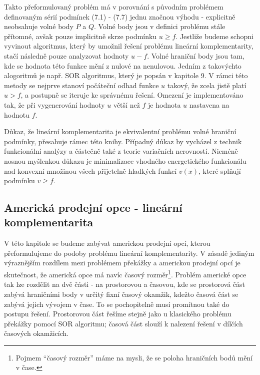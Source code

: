 \documentclass[a4paper]{book}
\begin{document}
Takto přeformulovaný problém má v porovnání s původním problémem definovaným sérií podmínek (7.1) - (7.7) jednu značnou výhodu - explicitně neobsahuje volné body $P$ a $Q$. Volné body jsou v definici problému stále přítomné, avšak pouze implicitně skrze podmínku $u \ge f$. Jestliže budeme schopni vyvinout algoritmus, který by umožnil řešení problému lineární komplementarity, stačí následně pouze analyzovat hodnoty $u - f$. Volné hraniční body jsou tam, kde se hodnota této funkce mění z nulové na nenulovou. Jedním z takovýchto alogoritmů je např. SOR algoritmus, který je popsán v kapitole 9. V rámci této metody se nejprve stanoví počáteční odhad funkce $u$ takový, že zcela jistě platí $u > f$, a postupně se iteruje ke správnému řešení. Omezení je implementováno tak, že při vygenerování hodnoty $u$ větší než $f$ je hodnota $u$ nastavena na hodnotu $f$.

Důkaz, že lineární komplementarita je ekvivalentní problému volné hraniční podmínky, přesahuje rámec této knihy. Případný důkaz by vycházel z technik funkcionální analýzy a částečně také z teorie variačních nerovností. Nicméně nosnou myšlenkou důkazu je minimalizace vhodného energetického funkcionálu nad konvexní množinou všech přijetelně hladkých funkcí $v(x)$, které splňují podmínku $v \ge f$.

\subsection{Americká prodejní opce - lineární komplementarita}

V této kapitole se budeme zabývat americkou prodejní opcí, kterou přeformulujeme do podoby problému lineární komplementarity. V zásadě jediným výraznějším rozdílem mezi problémem překážky a americkou prodejní opcí je skutečnost, že americká opce má navíc časový rozměr\footnote{Pojmem ``časový rozměr'' máme na mysli, že se poloha hraničních bodů mění v čase.}. Problém americké opce tak lze rozdělit na dvě části - na prostorovou a časovou, kde se prostorová část zabývá hraničními body v určitý fixní časový okamžik, kdežto časová část se zabývá jejich vývojem v čase. To se pochopitelně musí promítnou také do postupu řešení. Prostorovou část řešíme stejně jako u klasického problému překážky pomocí SOR algoritmu; časová část slouží k nalezení řešení v dílčích časových okamžicích.
\end{document}
